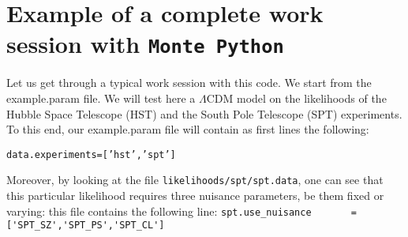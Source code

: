 \documentclass[10pt]{article}
\newcommand{\MP}{\texttt{Monte Python}}
\begin{document}
  \newpage
  \section{Example of a complete work session with \MP}
  Let us get through a typical work session with this code. We start from the
  example.param file. We will test here a $\Lambda$CDM model on the likelihoods
  of the Hubble Space Telescope (HST) and the South Pole Telescope (SPT)
  experiments.\\

  To this end, our example.param file will contain as first lines the following:
  
  \begin{alltt}
    data.experiments = ['hst','spt']
  \end{alltt}

  Moreover, by looking at the file \verb?likelihoods/spt/spt.data?, one can see
  that this particular likelihood requires three nuisance parameters, be them
  fixed or varying: this file contains the following line:
  \verb?spt.use_nuisance	   = ['SPT_SZ','SPT_PS','SPT_CL']?
\end{document}
